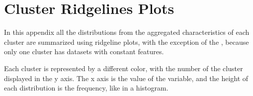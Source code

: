 \chapter{Cluster Ridgelines Plots}
\label{ape:joyplots}


In this appendix all the distributions from the aggregated characteristics of each cluster are summarized using ridgeline plots, with the exception of the , because only one cluster has datasets with constant features.

Each cluster is represented by a different color, with the number of the cluster displayed in the y axis. The x axis is the value of the variable, and the height of each distribution is the frequency, like in a histogram.

\singlespacing

\renewcommand{\arraystretch}{0.85}
\captionsetup{margin=1.0cm}  %


